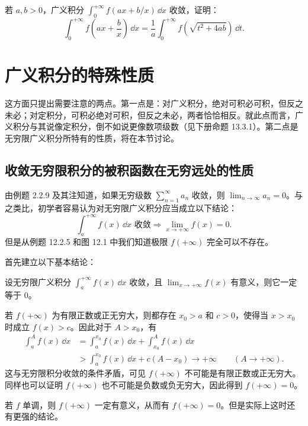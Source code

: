 \begin{xexercise}[7]
若 $a,b>0$，广义积分 $\int_0^{+\infty}f(ax+b/x)\,\dd x$ 收敛，证明：
  \[
    \int_0^{+\infty}f\left(ax+\frac bx\right)\,\dd x
    =\frac1a\int_0^{+\infty}f(\sqrt{t^2+4ab})\,\dd t.
  \]
\end{xexercise}

\section{广义积分的特殊性质}

这方面只提出需要注意的两点。第一点是：对广义积分，绝对可积必可积，但反之未必；对定积分，可积必绝对可积，但反之未必，两者恰恰相反。就此点而言，广义积分与其说像定积分，倒不如说更像数项级数（见下册命题 13.3.1）。第二点是无穷限广义积分所特有的性质，将在本节讨论。

\subsection{收敛无穷限积分的被积函数在无穷远处的性质}

由例题 2.2.9 及其注知道，如果无穷级数 $\sum_{n=1}^{\infty}a_n$ 收敛，则 $\lim_{n\to\infty}a_n=0$。与之类比，初学者容易认为对无穷限广义积分应当成立以下结论：
\[
  \int_a^{+\infty}f(x)\,\dd x\text{ 收敛}\Longrightarrow\lim_{x\to+\infty}f(x)=0.
\]
但是从例题 12.2.5 和图 12.1 中我们知道极限 $f(+\infty)$ 完全可以不存在。

首先建立以下基本结论：

\begin{xexample}[12.4.1]
设无穷限广义积分 $\int_a^{+\infty}f(x)\,\dd x$ 收敛，且 $\lim_{x\to+\infty}f(x)$ 有意义，则它一定等于 0。
\end{xexample}
\begin{xproof}
若 $f(+\infty)$ 为有限正数或正无穷大，则都存在 $x_0>a$ 和 $c>0$，使得当 $x>x_0$ 时成立 $f(x)>c$。因此对于 $A>x_0$，有
\begin{align*}
  \int_a^A f(x)\,\dd x
  &=\int_a^{x_0}f(x)\,\dd x+\int_{x_0}^A f(x)\,\dd x\\
  &>\int_a^{x_0}f(x)\,\dd x+c(A-x_0)\to+\infty\qquad(A\to+\infty).
\end{align*}
这与无穷限积分收敛的条件矛盾，可见 $f(+\infty)$ 不可能是有限正数或正无穷大。同样也可以证明 $f(+\infty)$ 也不可能是负数或负无穷大，因此得到 $f(+\infty)=0$。
\end{xproof}

若 $f$ 单调，则 $f(+\infty)$ 一定有意义，从而有 $f(+\infty)=0$。但是实际上这时还有更强的结论。

